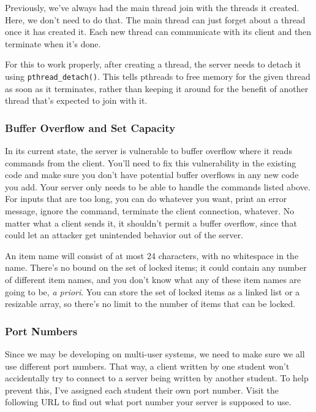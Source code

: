 \documentclass{article}
\begin{document}
\begin{enumerate}
  Previously, we've always had the main thread join with the threads
  it created.  Here, we don't need to do that.  The main thread can
  just forget about a thread once it has created it.  Each new thread can
  communicate with its client and then terminate when it's done.

  For this to work properly, after creating a thread, the server needs
  to detach it using \texttt{pthread\_detach()}.  This tells pthreads
  to free memory for the given thread as soon as it terminates, rather
  than keeping it around for the benefit of another thread that's
  expected to join with it.

\subsubsection*{Buffer Overflow and Set Capacity}

  In its current state, the server is vulnerable to buffer overflow
  where it reads commands from the client.  You'll need to fix this
  vulnerability in the existing code and make sure you don't have
  potential buffer overflows in any new code you add.  Your server
  only needs to be able to handle the commands listed above.  For
  inputs that are too long, you can do whatever you want, print an
  error message, ignore the command, terminate the client connection,
  whatever.  No matter what a client sends it, it shouldn't permit a
  buffer overflow, since that could let an attacker get unintended
  behavior out of the server.

  An item name will consist of at most 24 characters, with no
  whitespace in the name.  There's no bound on the set of locked
  items; it could contain any number of different item names, and you
  don't know what any of these item names are going to be, \textit{a
    priori}.  You can store the set of locked items as a linked list
  or a resizable array, so there's no limit to the number of items
  that can be locked.

\subsubsection*{Port Numbers}

  Since we may be developing on multi-user systems, we need to make
  sure we all use different port numbers.  That way, a client written
  by one student won't accidentally try to connect to a server being
  written by another student.  To help prevent this, I've assigned
  each student their own port number.  Visit the following URL to find
  out what port number your server is supposed to use.


\end{enumerate}
\end{document}

